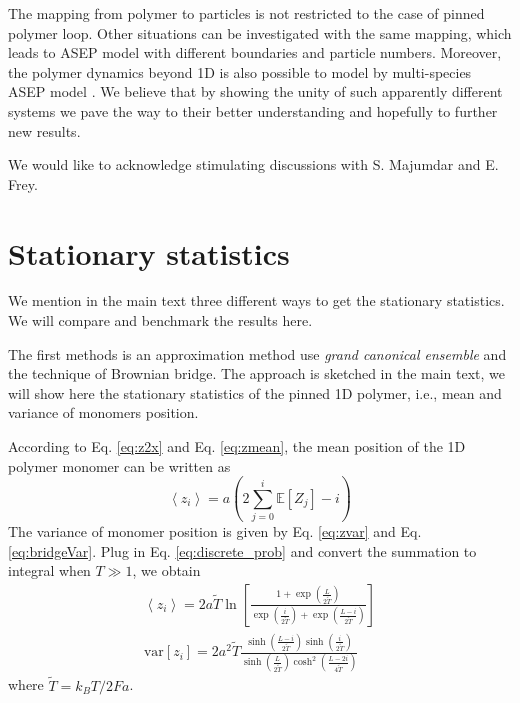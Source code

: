 \documentclass[aps,showpacs,twocolumn,floatfix,prx,superscriptaddress]{revtex4-1}
\begin{document}
The mapping from polymer to particles is not restricted to the case of pinned polymer loop. Other situations can be investigated with the same mapping, which leads to ASEP model with different boundaries and particle numbers. Moreover, the polymer dynamics beyond 1D is also possible to model by multi-species ASEP model \cite{Golinelli2006,Lazarescu2015a}. We believe that by showing the unity of such apparently different systems we pave the way to their better understanding and hopefully to further new results.
\begin{acknowledgments}
We would like to acknowledge stimulating discussions with S. Majumdar and E. Frey.\end{acknowledgments}


\appendix


\section{Stationary statistics}
\label{sec:stationary_statistics}
We mention in the main text three different ways to get the stationary statistics. We will compare and benchmark the results here.

The first methods is an approximation method use \emph{grand canonical ensemble} and the technique of Brownian bridge. The approach is sketched in the main text, we will show here the stationary statistics of the pinned 1D polymer, i.e., mean and variance of monomers position.

According to Eq. \eqref{eq:z2x} and Eq. \eqref{eq:zmean}, the mean position of the 1D polymer monomer can be written as 
\begin{equation}
    \label{eq:polymerMeanPos}
    \left< z_i \right> = a \left( 2 \sum_{j=0}^i \mathbb{E}\left[Z_j\right] - i \right)
\end{equation}
The variance of monomer position is given by Eq. \eqref{eq:zvar} and Eq. \eqref{eq:bridgeVar}. Plug in Eq. \eqref{eq:discrete_prob} and convert the summation to integral when $T\gg 1$, we obtain
\begin{subequations}
    \label{eq:meanVarPolymerPos}
    \begin{eqnarray}
        \left< z_i \right> = 2 a \tilde{T} \ln\left[ \frac{1+\exp\left(\frac{L}{2\tilde{T}}\right)}{\exp\left(\frac{i}{2\tilde{T}}\right) + \exp\left(\frac{L-i}{2\tilde{T}}\right)} \right] \\
        \text{var}\left[z_i\right] = 2 a^2 \tilde{T} \frac{ \sinh\left( \frac{L-i}{2\tilde{T}}\right) \sinh\left( \frac{i}{2\tilde{T}}\right)} {\sinh\left( \frac{L}{2\tilde{T}}\right) \cosh^2\left( \frac{L-2i}{4\tilde{T}}\right)}
    \end{eqnarray}
\end{subequations}
where $\tilde{T} = k_B T / 2Fa$. 
\end{document}
